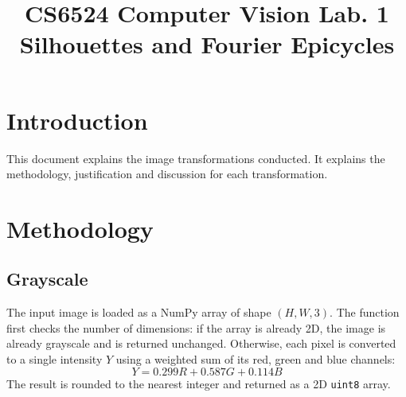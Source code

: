 \documentclass[conference]{IEEEtran}
\begin{document}
\title{CS6524 Computer Vision Lab. 1\\ Silhouettes and Fourier Epicycles}

\author{
\and
{}
\and
{}
\and
{}
}

\maketitle

\section{Introduction}
This document explains the image transformations conducted. It explains the methodology, justification and discussion for each transformation. 

\section{Methodology}
\subsection{Grayscale}
The input image is loaded as a NumPy array of shape $(H, W, 3)$. The function first checks the number of dimensions: if the array is already 2D, the image is already grayscale and is returned unchanged. Otherwise, each pixel is converted to a single intensity $Y$ using a weighted sum of its red, green and blue channels:
\begin{equation}
Y = 0.299R + 0.587G + 0.114B
\label{eq:luma}
\end{equation}
The result is rounded to the nearest integer and returned as a 2D \texttt{uint8} array.
\end{document}
